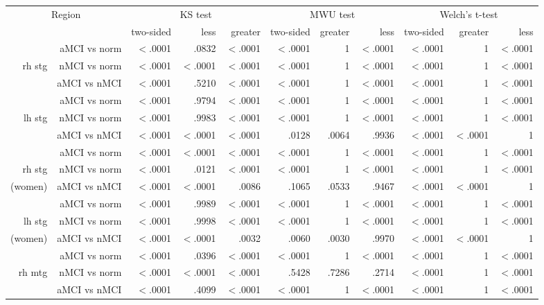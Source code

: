 \documentclass[12pt]{article}
\newcommand\T{\rule{0pt}{2.6ex}}
\newcommand\B{\rule[-1.2ex]{0pt}{0pt}}
\begin{document}
\newpage
\begin{sidewaystable}
	\centering
	\footnotesize
	\begin{tabular}{rr|rrr|rrr|rrr}
		\hline
		\multicolumn{2}{c|}{Region} \T\B & \multicolumn{3}{c|}{KS test} & \multicolumn{3}{c|}{MWU test} & \multicolumn{3}{c}{Welch's t-test} \\
		& & two-sided & less & greater & two-sided & greater & less & two-sided & greater & less \\ \hline
		& aMCI vs norm\T & $<$.0001 & .0832 & $<$.0001 & $<$.0001 & 1 & $<$.0001 & $<$.0001 & 1 & $<$.0001 \\
		rh stg & nMCI vs norm & $<$.0001 & $<$.0001 & $<$.0001 & $<$.0001 & 1 & $<$.0001 & $<$.0001 & 1 & $<$.0001 \\
		& aMCI vs nMCI\T & $<$.0001 & .5210 & $<$.0001 & $<$.0001 & 1 & $<$.0001 & $<$.0001 & 1 & $<$.0001 \\ \hline
		& aMCI vs norm & $<$.0001 & .9794 & $<$.0001 & $<$.0001 & 1 & $<$.0001 & $<$.0001 & 1 & $<$.0001 \\
		lh stg & nMCI vs norm & $<$.0001 & .9983 & $<$.0001 & $<$.0001 & 1 & $<$.0001 & $<$.0001 & 1 & $<$.0001 \\
		& aMCI vs nMCI & $<$.0001 & $<$.0001 & $<$.0001 & .0128 & .0064  & .9936 & $<$.0001 & $<$.0001 & 1 \\ \hline
		& aMCI vs norm\T & $<$.0001 & $<$.0001 & $<$.0001 & $<$.0001 & 1 & $<$.0001 & $<$.0001 & 1 & $<$.0001 \\
		rh stg & nMCI vs norm & $<$.0001 & .0121 & $<$.0001 & $<$.0001 & 1 & $<$.0001 & $<$.0001 & 1 & $<$.0001 \\
		(women)& aMCI vs nMCI & $<$.0001 & $<$.0001 & .0086 & .1065 & .0533 & .9467 & $<$.0001 & $<$.0001 & 1 \\ \hline
		& aMCI vs norm\T & $<$.0001 & .9989 & $<$.0001 & $<$.0001 & 1 & $<$.0001 & $<$.0001 & 1 & $<$.0001 \\
		lh stg & nMCI vs norm & $<$.0001 & .9998 & $<$.0001 & $<$.0001 & 1 & $<$.0001 & $<$.0001 & 1 & $<$.0001 \\
		(women)& aMCI vs nMCI & $<$.0001 & $<$.0001 & .0032 & .0060 & .0030 & .9970 & $<$.0001 & $<$.0001 & 1 \\ \hline
		& aMCI vs norm\T & $<$.0001 & .0396 & $<$.0001 & $<$.0001 & 1 & $<$.0001 & $<$.0001 & 1 & $<$.0001 \\
		rh mtg & nMCI vs norm & $<$.0001 & $<$.0001 & $<$.0001 & .5428 & .7286 & .2714 & $<$.0001 & 1 & $<$.0001 \\
		& aMCI vs nMCI & $<$.0001 & .4099 & $<$.0001 & $<$.0001 & 1 & $<$.0001 & $<$.0001 & 1 & $<$.0001 \\ \hline

\end{tabular}
\end{sidewaystable}
\end{document}
